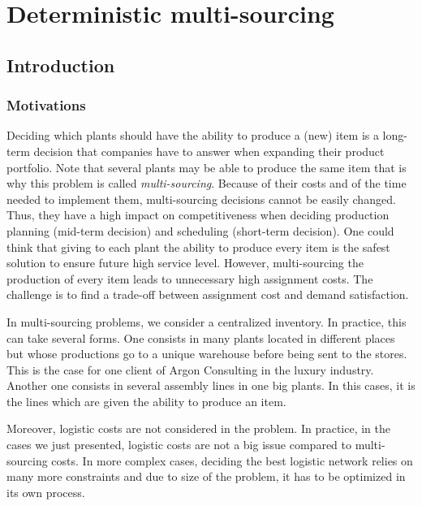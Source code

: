 \chapter{Deterministic multi-sourcing}
\label{chap:multi-sourcing:deterministic}


\section{Introduction}


\subsection{Motivations}
\label{sec:multi-sourcing:deterministic:introduction:motivations}


Deciding which plants should have the ability to produce a (new) item is a long-term decision that companies have to answer when expanding their product portfolio.
Note that several plants may be able to produce the same item that is why this problem is called \emph{multi-sourcing}.
Because of their costs and of the time needed to implement them, multi-sourcing decisions cannot be easily changed.
Thus, they have a high impact on competitiveness when deciding production planning (mid-term decision) and scheduling (short-term decision).
One could think that giving to each plant the ability to produce every item is the safest solution to ensure future high service level.
However, multi-sourcing the production of every item leads to unnecessary high assignment costs.
The challenge is to find a trade-off between assignment cost and demand satisfaction.


In multi-sourcing problems, we consider a centralized inventory.
In practice, this can take several forms.
One consists in many plants located in different places but whose productions go to a unique warehouse before being sent to the stores.
This is the case for one client of Argon Consulting in the luxury industry.
Another one consists in several assembly lines in one big plants.
In this cases, it is the lines which are given the ability to produce an item.


Moreover, logistic costs are not considered in the problem.
In practice, in the cases we just presented, logistic costs are not a big issue compared to multi-sourcing costs.
In more complex cases, deciding the best logistic network relies on many more constraints and due to size of the problem, it has to be optimized in its own process.


